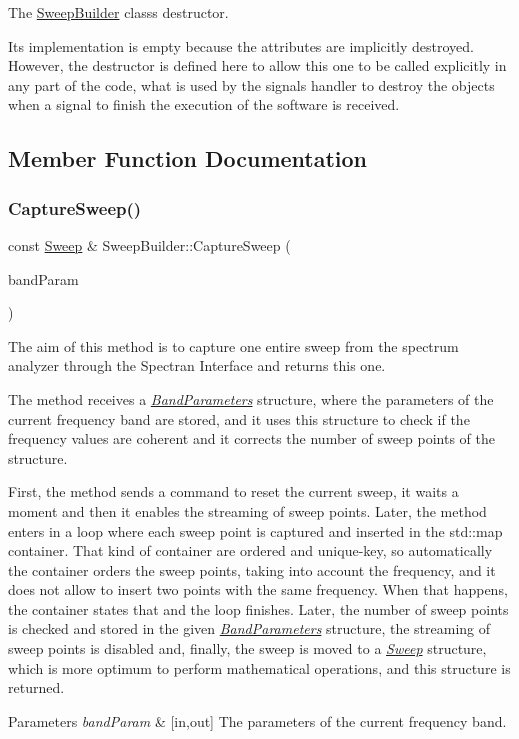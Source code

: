 The \hyperlink{classSweepBuilder}{Sweep\+Builder} class\textquotesingle{}s destructor. 

Its implementation is empty because the attributes are implicitly destroyed. However, the destructor is defined here to allow this one to be called explicitly in any part of the code, what is used by the signals handler to destroy the objects when a signal to finish the execution of the software is received. 

\subsection{Member Function Documentation}
\mbox{\label{classSweepBuilder_ae8893395594bbf68873d33e3e7a0d192}} 
\subsubsection{\texorpdfstring{Capture\+Sweep()}{CaptureSweep()}}
{\footnotesize\ttfamily const \hyperlink{structSweep}{Sweep} \& Sweep\+Builder\+::\+Capture\+Sweep (\begin{DoxyParamCaption}\item[{\hyperlink{structBandParameters}{Band\+Parameters} \&}]{band\+Param }\end{DoxyParamCaption})}



The aim of this method is to capture one entire sweep from the spectrum analyzer through the Spectran Interface and returns this one. 

The method receives a {\itshape \hyperlink{structBandParameters}{Band\+Parameters}} structure, where the parameters of the current frequency band are stored, and it uses this structure to check if the frequency values are coherent and it corrects the number of sweep points of the structure.

First, the method sends a command to reset the current sweep, it waits a moment and then it enables the streaming of sweep points. Later, the method enters in a loop where each sweep point is captured and inserted in the {\ttfamily std\+::map} container. That kind of container are ordered and unique-\/key, so automatically the container orders the sweep points, taking into account the frequency, and it does not allow to insert two points with the same frequency. When that happens, the container states that and the loop finishes. Later, the number of sweep points is checked and stored in the given {\itshape \hyperlink{structBandParameters}{Band\+Parameters}} structure, the streaming of sweep points is disabled and, finally, the sweep is moved to a {\itshape \hyperlink{structSweep}{Sweep}} structure, which is more optimum to perform mathematical operations, and this structure is returned. 
\begin{DoxyParams}{Parameters}
{\em band\+Param} & \mbox{[}in,out\mbox{]} The parameters of the current frequency band. \\
\hline
\end{DoxyParams}



